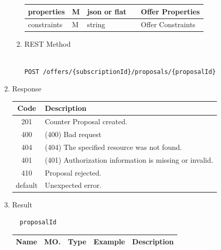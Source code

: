 \begin{enumerate}
\begin{enumerate}
\begin{center}
\begin{tabular}{|p{3cm}|l|p{3cm}|p{3cm}|p{4cm}|}
\hline	

properties		& M &	json or flat 	&		& Offer Properties		\\

\hline

constraints 	& M &	string			&		& Offer Constraints		\\

\hline

\end{tabular}
\end{center}

\item REST Method

\begin{tcolorbox}[boxrule=0pt, frame empty]
\begin{verbatim} 

POST /offers/{subscriptionId}/proposals/{proposalId}

\end{verbatim}
\end{tcolorbox}

\end{enumerate}

\item Response

\begin{center}
\begin{tabular}{|c|l|} 
\hline
\rowcolor{lightgray}	Code 		& 	Description \\
\hline
201	 		&	Counter Proposal created.  \\
\hline
400			&	(400) Bad request	\\
\hline
404			&	(404) The specified resource was not found. \\
\hline
401			&	(401) Authorization information is missing or invalid. \\
\hline
410			&	Proposal rejected. \\
\hline
default		&	Unexpected error. \\
\hline
\end{tabular}
\end{center}


\item Result

\begin{tcolorbox}[boxrule=0pt, frame empty]
\begin{verbatim}
  proposalId
\end{verbatim}
\end{tcolorbox}

\begin{center}
\begin{tabular}{|p{3cm}|l|p{3cm}|p{3cm}|p{4cm}|} 
\hline
\rowcolor{lightgray}	Name	& MO.	& Type	& Example & 	Description \\
\hline


\end{tabular}
\end{center}
\end{enumerate}

